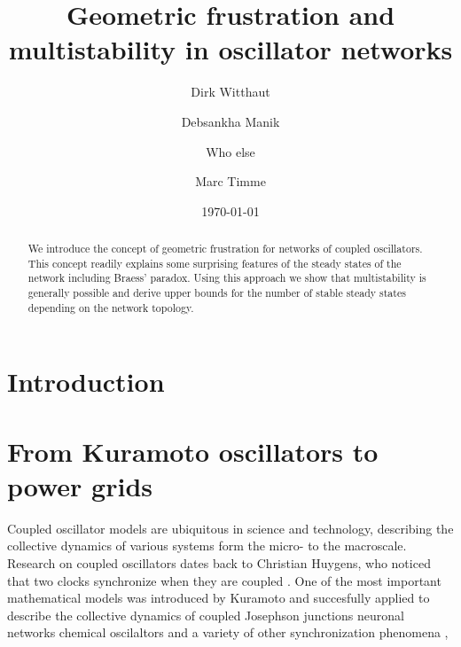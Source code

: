 \documentclass[10pt,aps,pra,onecolumn,superscriptaddress]{revtex4-1}
\begin{document}

\title{Geometric frustration and multistability in oscillator networks}

\author{Dirk Witthaut}

\author{Debsankha Manik}

\author{Who else}


\author{Marc Timme}



\date{\today }


\begin{abstract}
We introduce the concept of geometric frustration for networks
of coupled oscillators. This concept readily explains some 
surprising features of the steady states of the network 
including Braess' paradox.
Using this approach  
we show that multistability is generally possible and derive
upper bounds for the number of stable steady states depending
on the network topology.
\end{abstract}


\maketitle


\section{Introduction}


\section{From Kuramoto oscillators to power grids}

Coupled oscillator models are ubiquitous in science and technology,
describing the collective dynamics of various systems form
the micro- to the macroscale. Research on coupled
oscillators dates back to Christian Huygens, who noticed that
two clocks synchronize when they are coupled \cite{Huyg93}.
One of the most important mathematical models was introduced
by Kuramoto \cite{Kura84} and succesfully applied
to describe the collective dynamics 
of coupled Josephson junctions \cite{Wies96}
neuronal networks \cite{Vare01}
chemical oscilaltors \cite{Kiss02}
and a variety of other synchronization phenomena
\cite{Stro00,Aceb05,Aren08},
\end{document}
